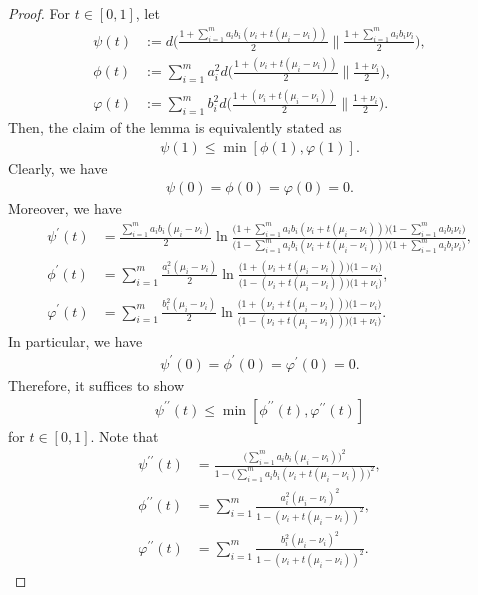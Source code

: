 \documentclass[10pt,a4paper]{amsart}
\begin{document}
\begin{proof}
For $t \in [0,1]$, let 
\begin{align*}
\psi(t) &:= d\bigg( \frac{1+ \sum_{i=1}^m a_i b_i(\nu_i + t(\mu_i-\nu_i))}{2} \bigg\| \frac{1+\sum_{i=1}^m a_i b_i \nu_i}{2}\bigg), \\
\phi(t) &:= \sum_{i=1}^m a_i^2 d\bigg( \frac{1+(\nu_i + t(\mu_i-\nu_i))}{2} \bigg\| \frac{1+\nu_i}{2}\bigg), \\
\varphi(t) &:= \sum_{i=1}^m b_i^2 d\bigg( \frac{1+(\nu_i + t(\mu_i-\nu_i))}{2} \bigg\| \frac{1+\nu_i}{2} \bigg).
\end{align*}
Then, the claim of the lemma is equivalently stated as 
\begin{align*}
\psi(1) \le \min[ \phi(1), \varphi(1)].
\end{align*}
Clearly, we have
\begin{align*}
\psi(0) = \phi(0) = \varphi(0) = 0.
\end{align*}
Moreover, we have
\begin{align*}
\psi^\prime(t) &= \frac{\sum_{i=1}^m a_i b_i (\mu_i-\nu_i)}{2} \ln \frac{\big(1+\sum_{i=1}^m a_i b_i (\nu_i + t(\mu_i-\nu_i))\big)\big(1-\sum_{i=1}^m a_i b_i \nu_i\big)}{\big(1-\sum_{i=1}^m a_i b_i (\nu_i + t(\mu_i-\nu_i))\big) \big(1+ \sum_{i=1}^m a_i b_i \nu_i\big)}, \\
\phi^\prime(t) &= \sum_{i=1}^m \frac{a_i^2(\mu_i-\nu_i)}{2} \ln \frac{\big( 1+ (\nu_i + t(\mu_i - \nu_i))\big)\big(1-\nu_i\big)}{\big(1- (\nu_i + t(\mu_i-\nu_i))\big)\big(1+\nu_i \big)}, \\
\varphi^\prime(t) &= \sum_{i=1}^m \frac{b_i^2(\mu_i-\nu_i)}{2} \ln \frac{\big(1+(\nu_i+t(\mu_i-\nu_i))\big)\big(1-\nu_i\big)}{\big(1-(\nu_i+t(\mu_i-\nu_i))\big)\big(1+\nu_i\big)}.
\end{align*}
In particular, we have
\begin{align*}
\psi^\prime(0) = \phi^\prime(0) = \varphi^\prime(0) = 0.
\end{align*}
Therefore, it suffices to show 
\begin{align} \label{eq:proof-inner-product-convexity-0}
\psi^{\prime\prime}(t) \le \min[ \phi^{\prime\prime}(t), \varphi^{\prime\prime}(t)]
\end{align}
for $t \in [0,1]$. Note that
\begin{align*}
\psi^{\prime\prime}(t) &= \frac{\big(\sum_{i=1}^m a_i b_i (\mu_i-\nu_i)\big)^2}{1 - \big(\sum_{i=1}^m a_i b_i (\nu_i + t(\mu_i - \nu_i))\big)^2}, \\
\phi^{\prime\prime}(t) &= \sum_{i=1}^m \frac{a_i^2 (\mu_i-\nu_i)^2}{1 - (\nu_i +t(\mu_i-\nu_i))^2}, \\
\varphi^{\prime\prime}(t) &= \sum_{i=1}^m \frac{b_i^2(\mu_i-\nu_i)^2}{1 - (\nu_i + t(\mu_i-\nu_i))^2}.
\end{align*}


\end{proof}
\end{document}
